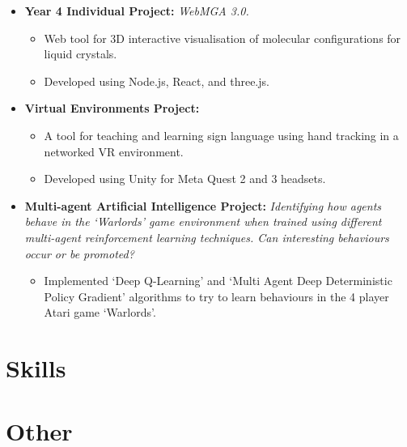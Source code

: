 \documentclass{moderncv}
\begin{document}
{\begin{itemize}
\begin{itemize}
\begin{itemize}
                \end{itemize}
                \item\textbf{Year 4 Individual Project:}
                \textit{WebMGA 3.0.}
                \begin{itemize}
                    \item Web tool for 3D interactive visualisation of molecular configurations for liquid crystals.
                    \item Developed using Node.js, React, and three.js.
                \end{itemize}
                \item\textbf{Virtual Environments Project:}
                \begin{itemize}
                    \item A tool for teaching and learning sign language using hand tracking in a networked VR environment.
                    \item Developed using Unity for Meta Quest 2 and 3 headsets.
                \end{itemize}
                \item\textbf{Multi-agent Artificial Intelligence Project:}
                \textit{Identifying how agents behave in the `Warlords' game environment when trained using different multi-agent reinforcement learning techniques. Can interesting behaviours occur or be promoted?}
                \begin{itemize}
                    \item Implemented `Deep Q-Learning' and `Multi Agent Deep Deterministic Policy Gradient' algorithms to try to learn behaviours in the 4 player Atari game `Warlords'.
                \end{itemize}
            \end{itemize}
        \end{itemize}
        }


    \section{Skills}

    \section{Other}
\end{document}
